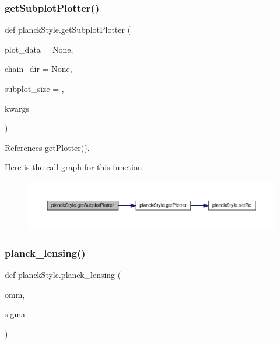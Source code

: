 \subsubsection{\texorpdfstring{get\+Subplot\+Plotter()}{getSubplotPlotter()}}
{\footnotesize\ttfamily def planck\+Style.\+get\+Subplot\+Plotter (\begin{DoxyParamCaption}\item[{}]{plot\+\_\+data = {\ttfamily None},  }\item[{}]{chain\+\_\+dir = {\ttfamily None},  }\item[{}]{subplot\+\_\+size = {},  }\item[{}]{kwargs }\end{DoxyParamCaption})}



References get\+Plotter().

Here is the call graph for this function\+:
\nopagebreak
\begin{figure}[H]
\begin{center}
\leavevmode
\includegraphics[width=350pt]{namespaceplanckStyle_a4fa115fe32762401a5a92d2b637bb8f9_cgraph}
\end{center}
\end{figure}
\mbox{\label{namespaceplanckStyle_a6a5c4a4fc4be0c23e0b51105fe5c5c7c}} 
\subsubsection{\texorpdfstring{planck\+\_\+lensing()}{planck\_lensing()}}
{\footnotesize\ttfamily def planck\+Style.\+planck\+\_\+lensing (\begin{DoxyParamCaption}\item[{}]{omm,  }\item[{}]{sigma }\end{DoxyParamCaption})}

\mbox{\label{namespaceplanckStyle_adfd4d32bbad84e5fec5961598ad40c5f}} 
